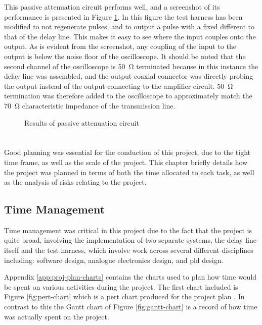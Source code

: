 This passive attenuation circuit performs well, and a screenshot of its performance is presented in Figure \ref{fig:final-breakthrough}. In this figure the test harness has been modified to not regenerate pulses, and to output a pulse with a fixed different to that of the delay line. This makes it easy to see where the input couples onto the output. As is evident from the screenshot, any coupling of the input to the output is below the noise floor of the oscilloscope. It should be noted that the second channel of the oscilloscope is \SI{50}{\ohm} terminated because in this instance the delay line was assembled, and the output coaxial connector was directly probing the output instead of the output connecting to the amplifier circuit. \SI{50}{\ohm} termination was therefore added to the oscilloscope to approximately match the \SI{70}{\ohm} characteristic impedance of the transmission line.

\begin{figure}[ht]
	\centering
	\caption{Results of passive attenuation circuit}
	\label{fig:final-breakthrough}
\end{figure}

\chapter{} \label{sec:project-planning}
Good planning was essential for the conduction of this project, due to the tight time frame, as well as the scale of the project. This chapter briefly details how the project was planned in terms of both the time allocated to each task, as well as the analysis of risks relating to the project.


\section{Time Management}

Time management was critical in this project due to the fact that the project is quite broad, involving the implementation of two separate systems, the delay line itself and the test harness, which involve work across several different disciplines including: software design, analogue electronics design, and \gls{pld} design.

Appendix \ref{app:proj-plan-charts} contains the charts used to plan how time would be spent on various activities during the project. The first chart included is Figure \ref{fig:pert-chart} which is a \gls{pert} chart produced for the project plan \cite[p.3]{tyler2017b}. In contrast to this the Gantt chart of Figure \ref{fig:gantt-chart} is a record of how time was actually spent on the project.

